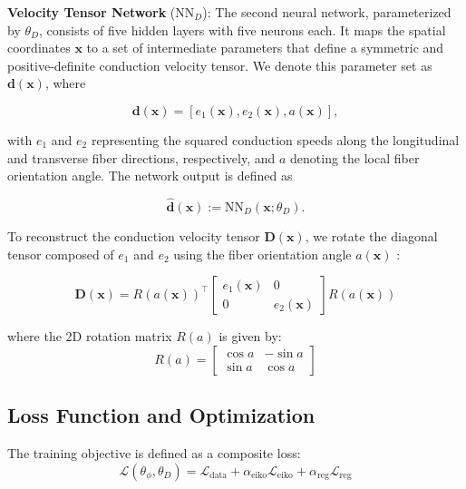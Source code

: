 \textbf{Velocity Tensor Network} ($\text{NN}_D$): The second neural network, parameterized by $\theta_D$, consists of five hidden layers with five neurons each. It maps the spatial coordinates $\mathbf{x}$ to a set of intermediate parameters that define a symmetric and positive-definite conduction velocity tensor. We denote this parameter set as $\mathbf{d}(\mathbf{x})$, where

\begin{equation}
    \mathbf{d}(\mathbf{x}) = [e_1(\mathbf{x}), e_2(\mathbf{x}), a(\mathbf{x})],
\end{equation}

with $e_1$ and $e_2$ representing the squared conduction speeds along the longitudinal and transverse fiber directions, respectively, and $a$ denoting the local fiber orientation angle. The network output is defined as

\begin{equation}
    \hat{\mathbf{d}}(\mathbf{x}) := \text{NN}_D(\mathbf{x}; \theta_D).
\end{equation}

To reconstruct the conduction velocity tensor $\mathbf{D}(\mathbf{x})$, we rotate the diagonal tensor composed of $e_1$ and $e_2$ using the fiber orientation angle $a(\mathbf{x})$ \cite{Arsigny2007}:

\begin{equation}
\mathbf{D}(\mathbf{x}) = R(a(\mathbf{x}))^\top 
\begin{bmatrix}
e_1(\mathbf{x}) & 0 \\
0 & e_2(\mathbf{x})
\end{bmatrix}
R(a(\mathbf{x}))
\end{equation}

where the 2D rotation matrix $R(a)$ is given by:
\begin{equation}
R(a) = 
\begin{bmatrix}
\cos a & -\sin a \\
\sin a & \cos a
\end{bmatrix}
\end{equation}

\subsection{Loss Function and Optimization}

The training objective is defined as a composite loss:
\begin{equation}
\mathcal{L}(\theta_\phi, \theta_D) = \mathcal{L}_{\text{data}} + \alpha_{\text{eiko}} \mathcal{L}_{\text{eiko}} + \alpha_{\text{reg}} \mathcal{L}_{\text{reg}}
\end{equation}

